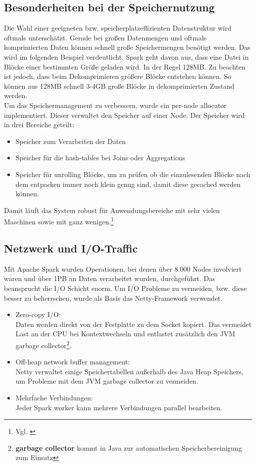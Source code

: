\subsection{Besonderheiten bei der Speichernutzung}
Die Wahl einer geeigneten bzw. speicherplatzeffizienten Datenstruktur wird oftmals unterschätzt. Gerade bei großen Datenmengen und oftmals komprimierten Daten können schnell große Speichermengen benötigt werden. Das wird im folgenden Beispiel verdeutlicht.
Spark geht davon aus, dass eine Datei in Blöcke einer bestimmten Größe geladen wird. In der Regel 128MB. Zu beachten ist jedoch, dass beim Dekomprimieren größere Blöcke entstehen können. So können aus 128MB schnell 3-4GB große Blöcke in dekomprimierten Zustand werden. \\ 

\noindent
Um das Speichermanagement zu verbessern, wurde ein per-node allocator implementiert. Dieser verwaltet den Speicher auf einer Node. 
Der Speicher wird in drei Bereiche geteilt:
\begin{itemize}
	\item Speicher zum Verarbeiten der Daten
	\item Speicher für die hash-tables bei Joins oder Aggregations
	\item Speicher für \glqq{}unrolling\grqq{} Blöcke, um zu prüfen ob die einzulesenden Blöcke nach dem entpacken immer noch klein genug sind, damit diese gecached werden können.
\end{itemize}
\noindent
Damit läuft das System robust für Anwendungsbereiche mit sehr vielen Maschinen sowie mit ganz wenigen.\footnote{Vgl. \cite{ADD+15}}

\subsection{Netzwerk und I/O-Traffic}

Mit Apache Spark wurden Operationen, bei denen über 8.000 Nodes involviert waren und über 1PB an Daten verarbeitet wurden, durchgeführt. Das beansprucht die I/O Schicht enorm.
Um I/O Probleme zu vermeiden, bzw. diese besser zu beherrschen, wurde als Basis das Netty-Framework verwendet.
\begin{itemize}
	\item Zero-copy I/O:\\
	Daten werden direkt von der Festplatte zu dem Socket kopiert. Das vermeidet Last an der CPU bei Kontextwechseln und entlastet zusätzlich den JVM garbage collector\footnote{\textbf{garbage collector} kommt in Java zur automatischen Speicherbereinigung zum Einsatz}.
	\item Off-heap network buffer management:\\
	Netty verwaltet einige Speichertabellen außerhalb des Java Heap Speichers, um Probleme mit dem JVM garbage collector zu vermeiden.
	\item Mehrfache Verbindungen:\\
	Jeder Spark worker kann mehrere Verbindungen parallel bearbeiten.
\end{itemize}


